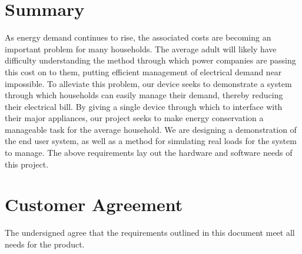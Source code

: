 \documentclass[12pt,letterpaper]{article}
\begin{document}
\section{Summary}

As energy demand continues to rise, the associated costs are becoming an
important problem for many households. The average adult will likely have
difficulty understanding the method through which power companies are passing
this cost on to them, putting efficient management of electrical demand near
impossible. To alleviate this problem, our device seeks to demonstrate a system
through which households can easily manage their demand, thereby reducing their
electrical bill. By giving a single device through which to interface with their
major appliances, our project seeks to make energy conservation a manageable
task for the average household. We are designing a demonstration of the end user
system, as well as a method for simulating real loads for the system to manage.
The above requirements lay out the hardware and software needs of this project.


\clearpage
\section{Customer Agreement}


The undersigned agree that the requirements outlined in this document meet all needs for the product.


\end{document}
